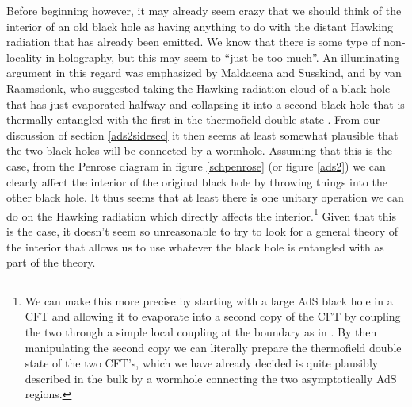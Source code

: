 \documentclass[12pt]{article}
\begin{document}
Before beginning however, it may already seem crazy that we should think of the interior of an old black hole as having anything to do with the distant Hawking radiation that has already been emitted.  We know that there is some type of non-locality in holography, but this may seem to ``just be too much''.  An illuminating argument in this regard was emphasized by Maldacena and Susskind, and by van Raamsdonk, who suggested taking the Hawking radiation cloud of a black hole that has just evaporated halfway and collapsing it into a second black hole that is thermally entangled with the first in the thermofield double state \cite{Maldacena:2013xja,VanRaamsdonk:2013sza}.  From our discussion of section \ref{ads2sidesec} it then seems at least somewhat plausible that the two black holes will be connected by a wormhole.  Assuming that this is the case, from the Penrose diagram in figure \ref{schpenrose} (or figure \ref{ads2}) we can clearly affect the interior of the original black hole by throwing things into the other black hole.  It thus seems that at least there is one unitary operation we can do on the Hawking radiation which directly affects the interior.\footnote{We can make this more precise by starting with a large AdS black hole in a CFT and allowing it to evaporate into a second copy of the CFT by coupling the two through a simple local coupling at the boundary as in \cite{Rocha:2008fe}.  By then manipulating the second copy we can literally prepare the thermofield double state of the two CFT's, which we have already decided is quite plausibly described in the bulk by a wormhole connecting the two asymptotically AdS regions.}  Given that this is the case, it doesn't seem so unreasonable to try to look for a general theory of the interior that allows us to use whatever the black hole is entangled with as part of the theory.  
\end{document}
